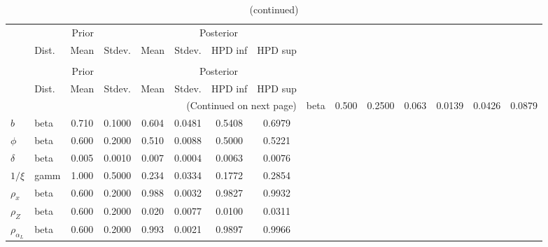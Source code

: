  
\begin{center}
\begin{longtable}{llcccccc} 
\caption{Results from Metropolis-Hastings (parameters)}
 \label{Table:MHPosterior:1}\\
\toprule 
  & \multicolumn{3}{c}{Prior}  &  \multicolumn{4}{c}{Posterior} \\
  \cmidrule(r{.75em}){2-4} \cmidrule(r{.75em}){5-8}
  & Dist. & Mean  & Stdev. & Mean & Stdev. & HPD inf & HPD sup\\
\midrule \endfirsthead 
\caption{(continued)}\\\toprule 
  & \multicolumn{3}{c}{Prior}  &  \multicolumn{4}{c}{Posterior} \\
  \cmidrule(r{.75em}){2-4} \cmidrule(r{.75em}){5-8}
  & Dist. & Mean  & Stdev. & Mean & Stdev. & HPD inf & HPD sup\\
\midrule \endhead 
\bottomrule \multicolumn{8}{r}{(Continued on next page)} \endfoot 
\bottomrule \endlastfoot 
$\alpha_L$ & beta &   0.500 & 0.2500 &   0.063& 0.0139 &  0.0426 &  0.0879 \\ 
$b$ & beta &   0.710 & 0.1000 &   0.604& 0.0481 &  0.5408 &  0.6979 \\ 
$\phi$ & beta &   0.600 & 0.2000 &   0.510& 0.0088 &  0.5000 &  0.5221 \\ 
${\delta}$ & beta &   0.005 & 0.0010 &   0.007& 0.0004 &  0.0063 &  0.0076 \\ 
${1/\xi}$ & gamm &   1.000 & 0.5000 &   0.234& 0.0334 &  0.1772 &  0.2854 \\ 
${\rho_x}$ & beta &   0.600 & 0.2000 &   0.988& 0.0032 &  0.9827 &  0.9932 \\ 
${\rho_Z}$ & beta &   0.600 & 0.2000 &   0.020& 0.0077 &  0.0100 &  0.0311 \\ 
${\rho_{\alpha_L}}$ & beta &   0.600 & 0.2000 &   0.993& 0.0021 &  0.9897 &  0.9966 \\ 
\end{longtable}
 \end{center}
